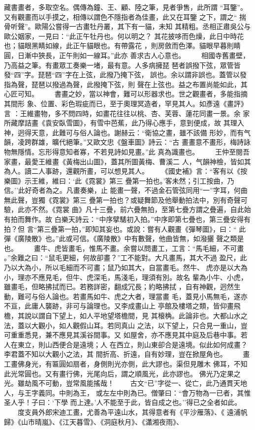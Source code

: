 \documentclass{ctexart}
\begin{document}
藏書畫者，多取空名。偶傳為鐘、王、顧、陸之筆，見者爭售，此所謂 ``耳鑒''。又有觀畫而以手摸之，相傳以謂色不隱指者為佳畫，此又在耳鑒 之下，謂之`` 揣骨听聲''。歐陽公嘗得一古畫牡丹叢，其下有一貓，未知 其精粗。丞相正肅吳公与歐公姻家，一見曰：``此正午牡丹也。何以明之？ 其花披哆而色燥，此日中時花也；貓眼黑睛如線，此正午貓眼也。有帶露花 ，則房斂而色澤。貓眼早暮則睛圓，日漸中狹長，正午則如一線耳。''此亦 善求古人心意也。 　　相國寺舊畫壁，乃高益之筆。有畫眾工奏樂一堵，最有意。人多病擁琵 琶者誤撥下弦，眾管皆發``四''字。琵琶``四''字在上弦，此撥乃掩下弦， 誤也。余以謂非誤也。蓋管以發指為聲，琵琶以撥過為聲，此撥掩下弦，則 聲在上弦也。益之布置尚能如此，其心匠可知。 　　書畫之妙，當以神會，難可以形器求也。世之觀畫者，多能指摘其間形 象、位置、彩色瑕疵而已，至于奧理冥造者，罕見其人。如彥遠《畫評》言 ：王維畫物，多不問四時，如畫花往往以桃、杏、芙蓉、蓮花同畫一景。余 家所藏摩詰畫《袁安臥雪圖》，有雪中芭蕉，此乃得心應手，意到便成，故 其理入神，迥得天意，此難可与俗人論也。謝赫云：``衛協之畫，雖不該備 形妙，而有气韻，凌跨群雄，曠代絕筆。''又歐文忠《盤車圖》詩云：``古 畫畫意不畫形，梅詩詠物無隱情。忘形得意知者寡，不若見詩如見畫。''此 真為識畫也。 　　王仲至閱吾家畫，最愛王維畫《黃梅出山圖》，蓋其所圖黃梅、曹溪二 人，气韻神檢，皆如其為人。讀二人事跡，還觀所畫，可以想見其人。 　　《國史補》言：``客有以《按樂圖》示王維，維曰：`此《霓裳》第三 疊第一拍也。'客未然；引工按曲，乃信。''此好奇者為之。凡畫奏樂，止 能畫一聲，不過金石管弦同用``一''字耳，何曲無此聲，豈獨《霓裳》第三 疊第一拍也？或疑舞節及他舉動拍法中，別有奇聲可驗，此亦不然。《霓裳 曲》凡十三疊，前六疊無拍，至第七疊方謂之疊遍，自此始有拍而舞作。故 白樂天詩云：``中序擘騞初入拍。''中序即第七疊也，第三疊安得有拍？但 言``第三疊第一拍，''即知其妄也。或說：嘗有人觀畫《彈琴圖》，曰：`` 此彈《廣陵散》也。''此或可信。《廣陵散》中有數聲，他曲皆無，如潑攦 聲之類是也。 　　畫牛、虎皆畫毛，惟馬不畫。余嘗以問畫工，工言：``馬毛細，不可畫 。''余難之曰：``鼠毛更細，何故卻畫？''工不能對。大凡畫馬，其大不過 盈尺，此乃以大為小，所以毛細而不可畫；鼠乃如其大，自當畫毛。然牛、 虎亦是以大為小，理亦不應見毛，但牛、虎深毛，馬淺毛，理須有別。故名 輩為小牛、小虎，雖畫毛，但略拂拭而已。若務詳密，翻成冗長；約略拂拭 ，自有神觀，迥然生動，難可与俗人論也。若畫馬如牛、虎之大者，理當畫 毛，蓋見小馬無毛，遂亦不亘，此庸人襲跡，非可与論理也。又李成畫山上 亭館及樓塔之類，皆仰畫飛檐，其說以謂自下望上，如人平地望塔檐間，見 其榱桷。此論非也。大都山水之法，蓋以大觀小，如人觀假山耳。若同真山 之法，以下望上，只合見一重山，豈可重重悉見，兼不應見其溪谷間事。又 如屋舍，亦不應見其中庭及后巷中事。若人在東立，則山西便合是遠境；人 在西立，則山東卻合是遠境。似此如何成畫？李君蓋不知以大觀小之法，其 間折高、折遠，自有妙理，豈在掀屋角也。 　　畫工畫佛身光，有匾圓如扇者，身側則光亦側，此大謬也。渠但見雕木 佛耳，不知此光常圓也。又有畫行佛，光尾向后，謂之順風光，此亦謬也。 佛光乃定果之光。雖劫風不可動，豈常風能搖哉！ 　　古文``已''字從一、從亡，此乃通貫天地人，与王字義同。中則為王， 或左左中則為已。僧肇曰：``會万物為一已者，其惟圣人乎！子曰：`下學 而上達。'人不能至于此，皆自成之也。''得已之全者如此。 　　度支員外郎宋迪工畫，尤善為平遠山水，其得意者有《平沙雁落》、《 遠浦帆歸》《山市晴嵐》、《江天暮雪》、《洞庭秋月》、《瀟湘夜雨》、 
\end{document}
